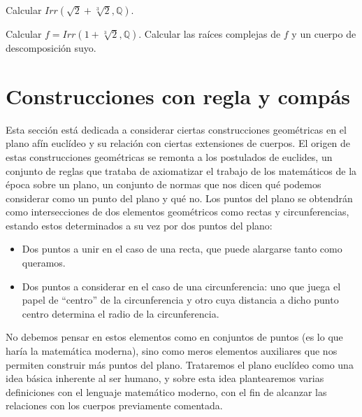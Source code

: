 \begin{ejercicio}
    Calcular $Irr(\sqrt{2}+\sqrt[3]{2}, \mathbb{Q})$.%
\end{ejercicio}

\begin{ejercicio}
    Calcular $f= Irr(1+\sqrt[3]{2},\mathbb{Q})$. Calcular las raíces complejas de $f$ y un cuerpo de descomposición suyo.
\end{ejercicio}

\section{Construcciones con regla y compás}
Esta sección está dedicada a considerar ciertas construcciones geométricas en el plano afín euclídeo y su relación con ciertas extensiones de cuerpos. El origen de estas construcciones geométricas se remonta a los postulados de euclides, un conjunto de reglas que trataba de axiomatizar el trabajo de los matemáticos de la época sobre un plano, un conjunto de normas que nos dicen qué podemos considerar como un punto del plano y qué no. Los puntos del plano se obtendrán como intersecciones de dos elementos geométricos como rectas y circunferencias, estando estos determinados a su vez por dos puntos del plano:
\begin{itemize}
    \item Dos puntos a unir en el caso de una recta, que puede alargarse tanto como queramos.
    \item Dos puntos a considerar en el caso de una circunferencia: uno que juega el papel de ``centro'' de la circunferencia y otro cuya distancia a dicho punto centro determina el radio de la circunferencia.
\end{itemize}
No debemos pensar en estos elementos como en conjuntos de puntos (es lo que haría la matemática moderna), sino como meros elementos auxiliares que nos permiten construir más puntos del plano. Trataremos el plano euclídeo como una idea básica inherente al ser humano, y sobre esta idea plantearemos varias definiciones con el lenguaje matemático moderno, con el fin de alcanzar las relaciones con los cuerpos previamente comentada.\\

